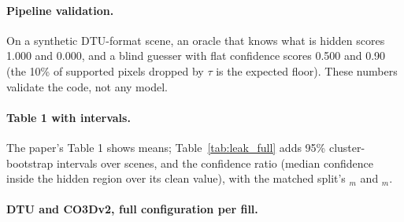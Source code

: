 \paragraph{Pipeline validation.}
On a synthetic DTU-format scene, an oracle that knows what is hidden scores \auroc{} 1.000 and \cur{} 0.000, and a blind guesser with flat confidence scores \auroc{} 0.500 and \cur{} 0.90 (the 10\% of supported pixels dropped by $\tau$ is the expected floor). These numbers validate the code, not any model.

\paragraph{Table 1 with intervals.}
The paper's Table 1 shows means; Table~\ref{tab:leak_full} adds 95\% cluster-bootstrap intervals over scenes, \curerr{} and the confidence ratio (median confidence inside the hidden region over its clean value), with the matched split's \auroc$_m$ and \cur$_m$.

\begin{table}[h]
\centering
\caption{\textbf{Native confidence, full numbers.} Blur and noise pooled, 18 scenes $\times$ 5 seeds $\times$ 2 radii; mean [95\% CI]; matched split seeds 0 and 1, radius 0.18.}
\label{tab:leak_full}
\footnotesize
\setlength{\tabcolsep}{3pt}
\resizebox{\textwidth}{!}{}
\end{table}

\paragraph{DTU and CO3Dv2, full configuration per fill.}

